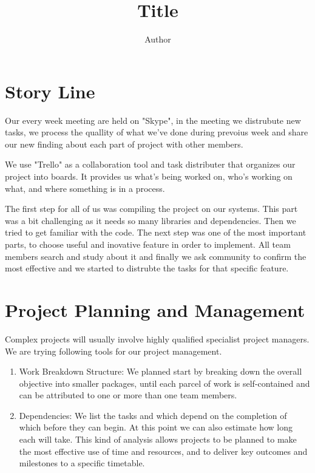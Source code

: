 \documentclass{article}%
\begin{document}
\title{ Title }
\author[]{ Author}
\maketitle


\begin{abstract}


\end{abstract}
\newpage

\section{Story Line}
Our every week meeting are held on "Skype", in the meeting we distrubute new tasks, we process the quallity of what we've done during prevoius week and share our new finding about each part of project with other members.

We use "Trello" as a collaboration tool and task distributer that organizes our project into boards. It provides us what's being worked on, who's working on what, and where something is in a process.

The first step for all of us was compiling the project on our systems. This part was a bit challenging as it needs so many libraries and dependencies. Then we tried to get familiar with the code. The next step was one of the most important parts, to choose useful and inovative feature in order to implement. All team members search and study about it and finally we ask community to confirm the most effective and we started to distrubte the tasks for that specific feature.

\section{Project Planning and Management}
Complex projects will usually involve highly qualified specialist project managers. We are trying following tools for our project management.
\begin{enumerate}
\item Work Breakdown Structure: 
We planned start by breaking down the overall objective into smaller packages, until each parcel 
of work is self-contained and can be attributed to one or more than one team members.
\item Dependencies: 
We list the tasks and which depend on the completion of which before they can begin. At this 
point we can also estimate how long each will take. 
This kind of analysis allows projects to be planned to make the most effective use of time and 
resources, and to deliver key outcomes and milestones to a specific timetable. 
\end{enumerate}
\end{document}
